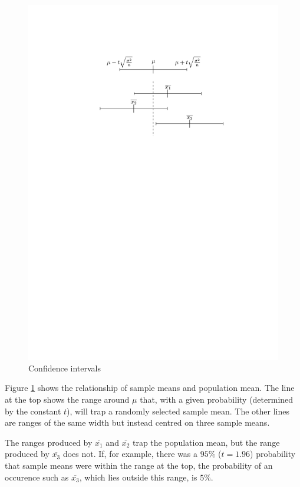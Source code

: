 \documentclass[a5paper]{article}
\begin{document}
\begin{figure}[ht]
  \includegraphics{confidence-intervals}
  \caption{Confidence intervals}
  \label{fig:4}
\end{figure}

Figure \ref{fig:4} shows the relationship of sample means and population mean.
The line at the top shows the range around $\mu$ that, with a given probability
(determined by the constant $t$), will trap a randomly selected sample mean. The
other lines are ranges of the same width but instead centred on three sample
means.

The ranges produced by $\overline{x_1}$ and $\overline{x_2}$ trap the population
mean, but the range produced by $\overline{x_3}$ does not. If, for example,
there was a $95\%$ \mbox{($t=1.96$)} probability that sample means were within
the range at the top, the probability of an occurence such as $\overline{x_3}$,
which lies outside this range, is $5\%$.
\end{document}
